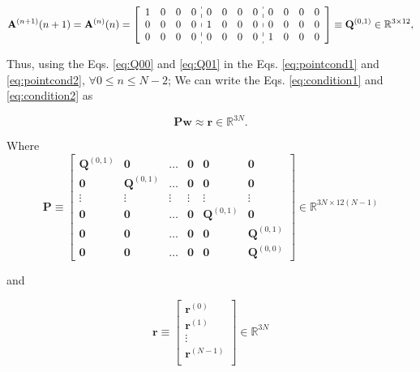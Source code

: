 \begin{equation}\label{eq:Q01}
\mathbf{A}^{(n+1)}(n+1)
=
\mathbf{A}^{(n)}(n)
=
\left[
\begin{array}{cccc:cccc:cccc}
1 & 0 & 0 & 0 &
0 & 0 & 0 & 0 &
0 & 0 & 0 & 0 \\
0 & 0 & 0 & 0 &
1 & 0 & 0 & 0 &
0 & 0 & 0 & 0 \\
0 & 0 & 0 & 0 &
0 & 0 & 0 & 0 &
1 & 0 & 0 & 0 
\end{array}
\right]
\equiv \mathbf{Q}^{(0,1)}\in \mathbb{R}^{3\times 12},
\end{equation}

Thus,
using the Eqs. \ref{eq:Q00} and \ref{eq:Q01} in 
the Eqs. \ref{eq:pointcond1} and \ref{eq:pointcond2}, 
$\forall 0 \leq n\leq N-2$;
We can write the Eqs. \ref{eq:condition1} and \ref{eq:condition2} as 

\begin{equation}
\mathbf{P}
\mathbf{w}
\approx \mathbf{r}\in \mathbb{R}^{3N}.
\end{equation}

Where
\begin{equation}\label{eq:Pmat}
\mathbf{P}
\equiv
\begin{bmatrix}
\mathbf{Q}^{(0,1)} & \mathbf{0}         & \hdots & \mathbf{0} & \mathbf{0}         & \mathbf{0}\\
\mathbf{0}         & \mathbf{Q}^{(0,1)} & \hdots & \mathbf{0} & \mathbf{0}         & \mathbf{0}\\
\vdots             & \vdots             & \vdots & \vdots     & \vdots             & \vdots    \\ 
\mathbf{0}         & \mathbf{0}         & \hdots & \mathbf{0} & \mathbf{Q}^{(0,1)} & \mathbf{0}\\
\mathbf{0}         & \mathbf{0}         & \hdots & \mathbf{0} & \mathbf{0}         & \mathbf{Q}^{(0,1)}\\
\mathbf{0}         & \mathbf{0}         & \hdots & \mathbf{0} & \mathbf{0}         & \mathbf{Q}^{(0,0)}
\end{bmatrix}
\in \mathbb{R}^{3N\times 12(N-1)}
\end{equation}

and

\begin{equation}\label{eq:rvec}
\mathbf{r}
\equiv
\begin{bmatrix}
\mathbf{r}^{(0)}\\
\mathbf{r}^{(1)}\\
\vdots\\
\mathbf{r}^{(N-1)}\\
\end{bmatrix}
\in \mathbb{R}^{3N}
\end{equation}


